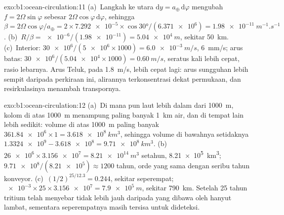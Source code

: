 \begin{solution}{exo:b1:ocean-circulation:11}
(a)~Langkah ke utara $\mathrm dy = a_\oplus\,\mathrm d\varphi$ mengubah $f = 2\Omega
\sin\varphi$ sebesar $2\Omega\cos\varphi\,\mathrm d\varphi$, sehingga $\beta = 2\Omega
\cos\varphi/a_\oplus = 2 \times \num{7.292e-5} \times \cos\ang{30}/(\num{6.371e6}) =
\qty{1.98e-11}{m^{-1}.s^{-1}}$. (b)~$R/\beta = \num{e-6}/(\num{1.98e-11}) =
\qty{5.04e4}{m}$, sekitar \qty{50}{km}. (c)~Interior: $\num{30e6}/(\num{5e6} \times
1000) = \qty{6.0e-3}{m/s}$, \qty{6}{mm/s}; arus batas: $\num{30e6}/(\num{5.04e4}
\times 1000) = \qty{0.60}{m/s}$, seratus kali lebih cepat, rasio lebarnya. Arus Teluk, pada \qty{1.8}{m/s}, lebih cepat lagi: arus sungguhan lebih sempit daripada perkiraan ini, alirannya terkonsentrasi dekat permukaan, dan resirkulasinya menambah transpornya.
\end{solution}

\begin{solution}{exo:b1:ocean-circulation:12}
(a)~Di mana pun laut lebih dalam dari \qty{1000}{m}, kolom di atas \qty{1000}{m} menampung paling banyak \qty{1}{km} air, dan di tempat lain lebih sedikit: volume di atas \qty{1000}{m} paling banyak $\num{361.84e6} \times 1 = \qty{3.618e8}{km^3}$, sehingga volume di bawahnya setidaknya $\num{1.3324e9} - \num{3.618e8} = \qty{9.71e8}{km^3}$.
(b)~$\num{26e6} \times \num{3.156e7} = \qty{8.21e14}{m^3}$ setahun,
\qty{8.21e5}{km^3}; $\num{9.71e8}/(\num{8.21e5}) \approx 1200$ tahun, orde yang sama
dengan seribu tahun konveyor. (c)~$(1/2)^{25/12.3} = 0.244$, sekitar seperempat;
$\num{e-3} \times 25 \times \num{3.156e7} = \qty{7.9e5}{m}$, sekitar \qty{790}{km}.
Setelah 25 tahun tritium telah menyebar tidak lebih jauh daripada yang dibawa oleh hanyut lambat,
sementara seperempatnya masih tersisa untuk dideteksi.
\end{solution}

